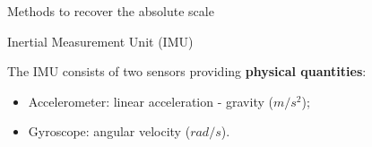 \documentclass{beamer}
\begin{document}
\begin{frame}{Methods to recover the absolute scale}
\begin{figure}
{\begin{subfigure}[b]{0.3\textwidth}
      \end{subfigure}
    }
  \end{figure}
\end{frame}

\begin{frame}{Inertial Measurement Unit (IMU)}

The IMU consists of two sensors providing \textbf{physical quantities}:
\begin{itemize}
\item Accelerometer: linear acceleration - gravity ($m/s^2$);
\item Gyroscope: angular velocity ($rad/s$).
\end{itemize}

\end{frame}
\end{document}
